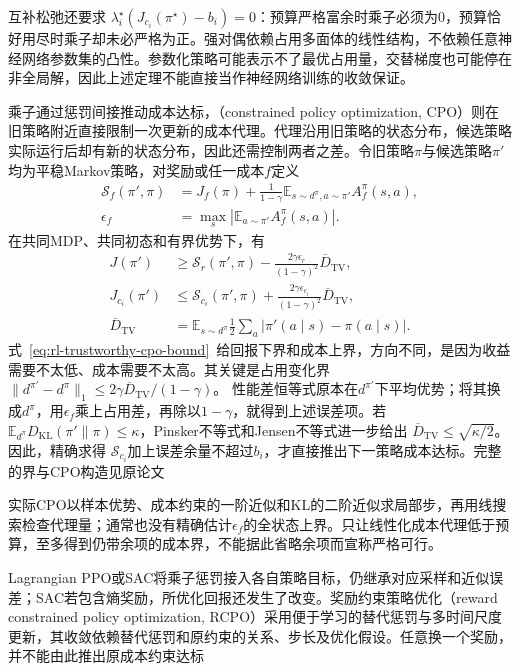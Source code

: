 互补松弛还要求
$\lambda_i^\star(J_{c_i}(\pi^\star)-b_i)=0$：预算严格富余时乘子必须为0，预算恰好用尽时乘子却未必严格为正。强对偶依赖占用多面体的线性结构，不依赖任意神经网络参数集的凸性。参数化策略可能表示不了最优占用量，交替梯度也可能停在非全局解，因此上述定理不能直接当作神经网络训练的收敛保证。

乘子通过惩罚间接推动成本达标，（constrained policy optimization, CPO）则在旧策略附近直接限制一次更新的成本代理。代理沿用旧策略的状态分布，候选策略实际运行后却有新的状态分布，因此还需控制两者之差。令旧策略$\pi$与候选策略$\pi'$均为平稳Markov策略，对奖励或任一成本$f$定义
\[
  \begin{aligned}
    \mathcal S_f(\pi',\pi)
      &=J_f(\pi)+\frac{1}{1-\gamma}
          \mathbb E_{s\sim d^\pi,a\sim\pi'}A_f^\pi(s,a),\\
    \epsilon_f
      &=\max_s\left|\mathbb E_{a\sim\pi'}A_f^\pi(s,a)\right|.
  \end{aligned}
\]
在共同MDP、共同初态和有界优势下，有
\begin{align}
  J(\pi')&\geq\mathcal S_r(\pi',\pi)
      -\frac{2\gamma\epsilon_r}{(1-\gamma)^2}\overline D_{\mathrm{TV}},
      \nonumber\\
  J_{c_i}(\pi')&\leq\mathcal S_{c_i}(\pi',\pi)
      +\frac{2\gamma\epsilon_{c_i}}{(1-\gamma)^2}\overline D_{\mathrm{TV}},
  \label{eq:rl-trustworthy-cpo-bound}\\
  \overline D_{\mathrm{TV}}
    &=\mathbb E_{s\sim d^\pi}
          \frac12\sum_a|\pi'(a\mid s)-\pi(a\mid s)|. \nonumber
\end{align}
式~\eqref{eq:rl-trustworthy-cpo-bound}~给回报下界和成本上界，方向不同，是因为收益需要不太低、成本需要不太高。其关键是占用变化界
$\|d^{\pi'}-d^\pi\|_1\leq
2\gamma\overline D_{\mathrm{TV}}/(1-\gamma)$。
性能差恒等式原本在$d^{\pi'}$下平均优势；将其换成$d^\pi$，用$\epsilon_f$乘上占用差，再除以$1-\gamma$，就得到上述误差项。若
$\mathbb E_{d^\pi}D_{\mathrm{KL}}(\pi'\|\pi)\leq\kappa$，Pinsker不等式和Jensen不等式进一步给出
$\overline D_{\mathrm{TV}}\leq\sqrt{\kappa/2}$。因此，精确求得
$\mathcal S_{c_i}$加上误差余量不超过$b_i$，才直接推出下一策略成本达标。完整的界与CPO构造见原论文

实际CPO以样本优势、成本约束的一阶近似和KL的二阶近似求局部步，再用线搜索检查代理量；通常也没有精确估计$\epsilon_f$的全状态上界。只让线性化成本代理低于预算，至多得到仍带余项的成本界，不能据此省略余项而宣称严格可行。

Lagrangian PPO或SAC将乘子惩罚接入各自策略目标，仍继承对应采样和近似误差；SAC若包含熵奖励，所优化回报还发生了改变。奖励约束策略优化（reward constrained policy optimization, RCPO）采用便于学习的替代惩罚与多时间尺度更新，其收敛依赖替代惩罚和原约束的关系、步长及优化假设。任意换一个奖励，并不能由此推出原成本约束达标

